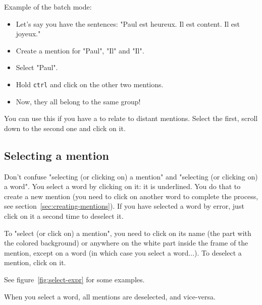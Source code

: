 \documentclass[12pt]{article}
\begin{document}
Example of the batch mode:
\begin{itemize}
   \item Let's say you have the sentences: "Paul est heureux.  Il est
   content. Il est joyeux."
   \item Create a mention for "Paul", "Il" and "Il".
   \item Select "Paul".
   \item Hold \verb|ctrl| and click on the other two mentions.
   \item Now, they all belong to the same group!
\end{itemize}

You can use this if you have a to relate to distant mentions.  Select the
first, scroll down to the second one and click on it.

 \subsection{Selecting a mention}

Don't confuse "selecting (or clicking on) a mention" and "selecting (or
clicking on) a word".  You select a word by clicking on it: it is underlined.
You do that to create a new mention (you need to click on another word to
complete the process, see section~\ref{sec:creating-mentions}).  If you have
selected a word by error, just click on it a second time to deselect it.

To "select (or click on) a mention", you need to click on its name (the part
with the colored background) or anywhere on the white part inside the frame
of the mention, except on a word (in which case you select a word...).  To
deselect a mention, click on it.

See figure~\ref{fig:select-expr} for some examples.

When you select a word, all mentions are deselected, and vice-versa.
\end{document}
